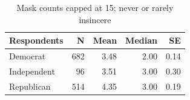 \begin{table}[ht]
\centering
\caption{Mask counts capped at 15; never or rarely insincere}
\label{tab:trump_sum}
\begin{tabular}{lrrrr}
  \toprule
Respondents & N & Mean & Median & SE \\
  \midrule
Democrat & 682 & 3.48 & 2.00 & 0.14 \\
  Independent &  96 & 3.51 & 3.00 & 0.30 \\
  Republican & 514 & 4.35 & 3.00 & 0.19 \\
   \bottomrule
\end{tabular}
\end{table}
